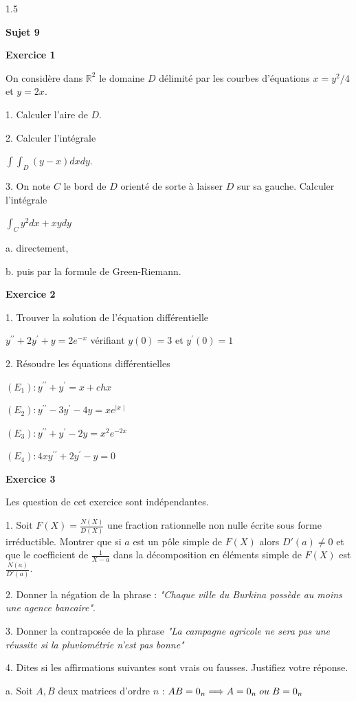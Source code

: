 \documentclass[12pt]{article}
\begin{document}
\begin{spacing}{1.5}
 
 \quad
 \quad
 
 \medskip\textbf{Sujet 9}
 
 
 \medskip\textbf{Exercice 1}

On considère dans $\mathbb{R}^2$ le domaine $D$ délimité par les courbes d'équations $x = y^2/4$ et $y = 2x$.
 
 1. Calculer l'aire de $D$.
 
 2. Calculer l'intégrale

$\int\int_D(y-x)dxdy$.

3. On note $C$ le bord de $D$ orienté de sorte à laisser $D$ sur sa gauche. Calculer l'intégrale

$\int_Cy^2dx+xydy$

a. directement,

b. puis par la formule de Green-Riemann.


\medskip\textbf{Exercice 2}

1. Trouver la solution de l'équation différentielle

$y^{\prime\prime}+2y^{\prime}+y=2e^{-x}$ vérifiant $y(0)=3$ et $y^{\prime}(0)=1$

2. Résoudre les équations différentielles 

$(E_1): y^{\prime\prime}+y^{\prime}=x+chx$

$(E_2): y^{\prime\prime}-3y^{\prime}-4y=xe^{\mid x\mid}$

$(E_3): y^{\prime\prime}+y^{\prime}-2y=x^2e^{-2x}$

$(E_4): 4xy^{\prime\prime}+2y^{\prime}-y=0$


\medskip\textbf{Exercice 3}

Les question de cet exercice sont indépendantes.

1. Soit $F(X)=\frac{N(X)}{D(X)}$ une fraction rationnelle non nulle écrite sous forme irréductible. Montrer que si $a$ est un pôle simple de $F(X)$ alors $D'(a)\neq 0$ et que le coefficient de $\frac{1}{X-a}$ dans la décomposition en éléments simple de $F(X)$ est $\frac{N(a)}{D'(a)}$.

2. Donner la négation de la phrase : \emph{"Chaque ville du Burkina possède au moins une agence bancaire"}.

3. Donner la contraposée de la phrase \emph{"La campagne agricole ne sera pas une réussite si la pluviométrie n'est pas bonne"}

4. Dites si les affirmations suivantes sont vrais ou fausses. Justifiez votre réponse.

a. Soit $A,B$ deux matrices d'ordre $n$ : $AB=0_n\Longrightarrow A=0_n \hspace{0.1cm} ou \hspace{0.1cm} B=0_n$


\end{spacing}
\end{document}
